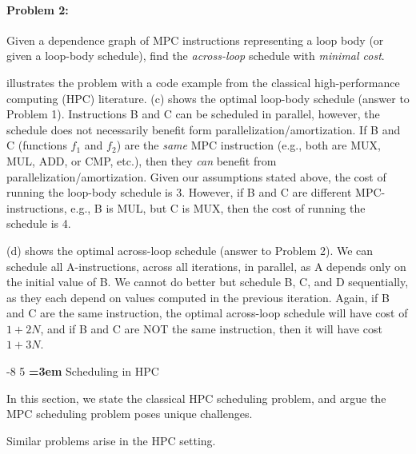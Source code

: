\documentclass[sigconf, screen, natbib=false, dvipsnames, table]{acmart}
\makeatletter
\renewcommand{\subsection}{\@startsection{subsection}{2}{\z@}%
                        {-8\p@ \@plus -4\p@ \@minus -4\p@}%
                        {5\p@ \@plus 2\p@ \@minus 2\p@}%
                        {\normalfont\Large\bfseries\boldmath
                         \rightskip=\z@ \@plus 3em\pretolerance=10000 }}
\theoremstyle{definition}
\makeatother
\begin{document}
\paragraph{Problem 2:} Given a dependence graph of MPC instructions representing a loop body (or given a loop-body schedule), 
find the \emph{across-loop} schedule with  \emph{minimal cost}.

 illustrates the problem with a code example from the classical high-performance computing (HPC) literature. 
(c) shows the optimal loop-body schedule (answer to Problem 1). Instructions B and C can be scheduled in parallel, 
however, the schedule does not necessarily benefit form parallelization/amortization. If B and C (functions $f_1$ and $f_2$) are the \emph{same}
MPC instruction (e.g., both are MUX, MUL, ADD, or CMP, etc.), then they \emph{can} benefit from parallelization/amortization. Given
our assumptions stated above, the cost of running the loop-body schedule is 3. However, if B and C are different MPC-instructions,
e.g., B is MUL, but C is MUX, then the cost of running the schedule is 4. 

(d) shows the optimal across-loop schedule (answer to Problem 2). We can schedule all A-instructions, across all iterations, 
in parallel, as A depends only on the initial value of B. We cannot do better but schedule B, C, and D sequentially, as they each depend on values
computed in the previous iteration. Again, if B and C are the same instruction, the optimal across-loop schedule will have cost of $1 + 2N$, 
and if B and C are NOT the same instruction, then it will have cost $1+3N$.








\subsection{Scheduling in HPC}
\label{sec:hpc}

In this section, we state the classical HPC scheduling problem, and argue the MPC scheduling problem poses unique challenges.

Similar problems arise in the HPC setting.
\end{document}
